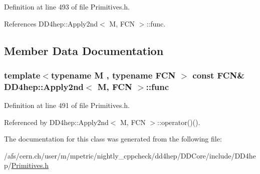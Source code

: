 Definition at line 493 of file Primitives.h.

References DD4hep::Apply2nd$<$ M, FCN $>$::func.

\subsection{Member Data Documentation}
\hypertarget{class_d_d4hep_1_1_apply2nd_aa83e5fb456b913dfe4801fb585b073e0}{
\subsubsection[{func}]{\setlength{\rightskip}{0pt plus 5cm}template$<$typename M , typename FCN $>$ const FCN\& {\bf DD4hep::Apply2nd}$<$ M, FCN $>$::{\bf func}}}
\label{class_d_d4hep_1_1_apply2nd_aa83e5fb456b913dfe4801fb585b073e0}


Definition at line 491 of file Primitives.h.

Referenced by DD4hep::Apply2nd$<$ M, FCN $>$::operator()().

The documentation for this class was generated from the following file:\begin{DoxyCompactItemize}
\item 
/afs/cern.ch/user/m/mpetric/nightly\_\-cppcheck/dd4hep/DDCore/include/DD4hep/\hyperlink{_primitives_8h}{Primitives.h}\end{DoxyCompactItemize}
